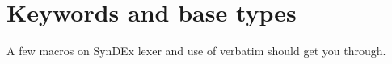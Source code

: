 \chapter{Keywords and base types}

A few macros on SynDEx lexer and use of verbatim should get you through.

